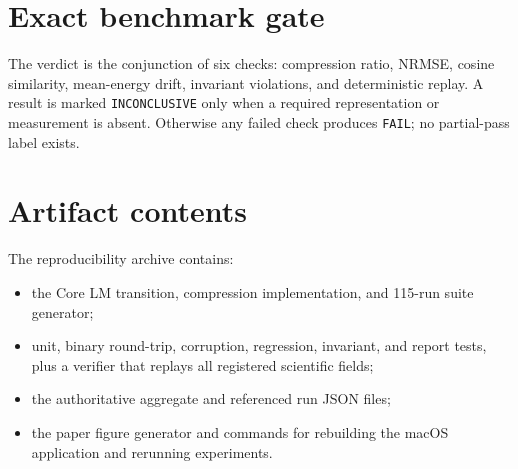 \documentclass[10pt]{article}
\begin{document}



\appendix
\section{Exact benchmark gate}

The verdict is the conjunction of six checks: compression ratio, NRMSE, cosine
similarity, mean-energy drift, invariant violations, and deterministic replay.
A result is marked \texttt{INCONCLUSIVE} only when a required representation or
measurement is absent. Otherwise any failed check produces \texttt{FAIL}; no
partial-pass label exists.

\section{Artifact contents}

The reproducibility archive contains:
\begin{itemize}[leftmargin=1.4em,itemsep=1pt]
  \item the Core LM transition, compression implementation, and 115-run suite
        generator;
  \item unit, binary round-trip, corruption, regression, invariant, and report
        tests, plus a verifier that replays all registered scientific fields;
  \item the authoritative aggregate and referenced run JSON files;
  \item the paper figure generator and commands for rebuilding the macOS
        application and rerunning experiments.
\end{itemize}
\end{document}

